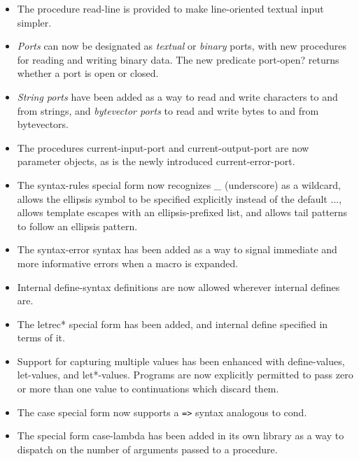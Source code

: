 \begin{itemize}
\item The procedure {\cf read-line} is provided to make line-oriented textual input
simpler.

\item {\em Ports} can now be designated as {\em textual} or {\em
binary} ports, with new procedures for reading and writing binary
data.
The new predicate {\cf port-open?} returns whether a port is open or closed.

\item {\em String ports} have been added as a way to read and write
characters to and from strings, and {\em bytevector ports} to read
and write bytes to and from bytevectors.

\item The procedures {\cf current-input-port} and {\cf current-output-port} are now
parameter objects, as is the newly introduced {\cf
current-error-port}.

\item The {\cf syntax-rules} special form now recognizes {\em \_} (underscore) as a wildcard, allows
the ellipsis symbol to be specified explicitly instead of the default
{\cf ...}, allows template escapes with an ellipsis-prefixed list, and
allows tail patterns to follow an ellipsis pattern.

\item The {\cf syntax-error} syntax has been added as a way to signal immediate
and more informative errors when a macro is expanded.

\item Internal {\cf define-syntax} definitions are now allowed wherever
internal {\cf define}s are.

\item The {\cf letrec*} special form has been added, and internal {\cf define} specified in
terms of it.

\item Support for capturing multiple values has been enhanced with {\cf
define-values}, {\cf let-values}, and {\cf let*-values}.
Programs are now explicitly permitted to pass zero or more than one
value to continuations which discard them.

\item The {\cf case} special form now supports a {\tt =>} syntax analogous to {\cf cond}.

\item The special form {\cf case-lambda} has been added in its own library as a way to
dispatch on the number of arguments passed to a procedure.


\end{itemize}

